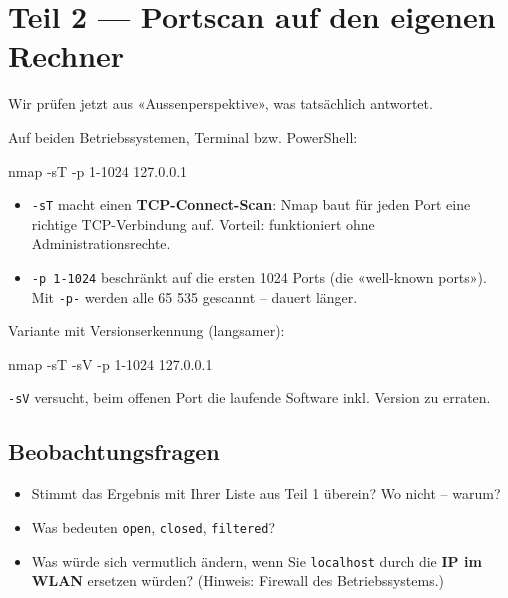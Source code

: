 \documentclass[
  nswissgerman,
  a4paper,
  DIV=11,
  numbers=noendperiod,
  ngerman]{scrreprt}
\newenvironment{Shaded}{\begin{snugshade}}{\end{snugshade}}
\newcommand{\AttributeTok}[1]{\textcolor[rgb]{0.40,0.45,0.13}{#1}}
\newcommand{\FunctionTok}[1]{\textcolor[rgb]{0.28,0.35,0.67}{#1}}
\newcommand{\NormalTok}[1]{\textcolor[rgb]{0.00,0.23,0.31}{#1}}
\providecommand{\tightlist}{%
  \setlength{\itemsep}{0pt}\setlength{\parskip}{0pt}}
\begin{document}
\section{Teil 2 --- Portscan auf den eigenen
Rechner}\label{teil-2-portscan-auf-den-eigenen-rechner}

Wir prüfen jetzt aus «Aussenperspektive», was tatsächlich antwortet.

Auf beiden Betriebssystemen, Terminal bzw. PowerShell:

\begin{Shaded}
\begin{Highlighting}[numbers=left,,]
\FunctionTok{nmap} \AttributeTok{{-}sT} \AttributeTok{{-}p}\NormalTok{ 1{-}1024 127.0.0.1}
\end{Highlighting}
\end{Shaded}

\begin{itemize}
\tightlist
\item
  \texttt{-sT} macht einen \textbf{TCP-Connect-Scan}: Nmap baut für
  jeden Port eine richtige TCP-Verbindung auf. Vorteil: funktioniert
  ohne Administrationsrechte.
\item
  \texttt{-p\ 1-1024} beschränkt auf die ersten 1024 Ports (die
  «well-known ports»). Mit \texttt{-p-} werden alle 65 535 gescannt --
  dauert länger.
\end{itemize}

Variante mit Versionserkennung (langsamer):

\begin{Shaded}
\begin{Highlighting}[numbers=left,,]
\FunctionTok{nmap} \AttributeTok{{-}sT} \AttributeTok{{-}sV} \AttributeTok{{-}p}\NormalTok{ 1{-}1024 127.0.0.1}
\end{Highlighting}
\end{Shaded}

\texttt{-sV} versucht, beim offenen Port die laufende Software inkl.
Version zu erraten.

\subsection{Beobachtungsfragen}\label{beobachtungsfragen-1}

\begin{itemize}
\tightlist
\item
  Stimmt das Ergebnis mit Ihrer Liste aus Teil 1 überein? Wo nicht --
  warum?
\item
  Was bedeuten \texttt{open}, \texttt{closed}, \texttt{filtered}?
\item
  Was würde sich vermutlich ändern, wenn Sie \texttt{localhost} durch
  die \textbf{IP im WLAN} ersetzen würden? (Hinweis: Firewall des
  Betriebssystems.)
\end{itemize}
\end{document}
